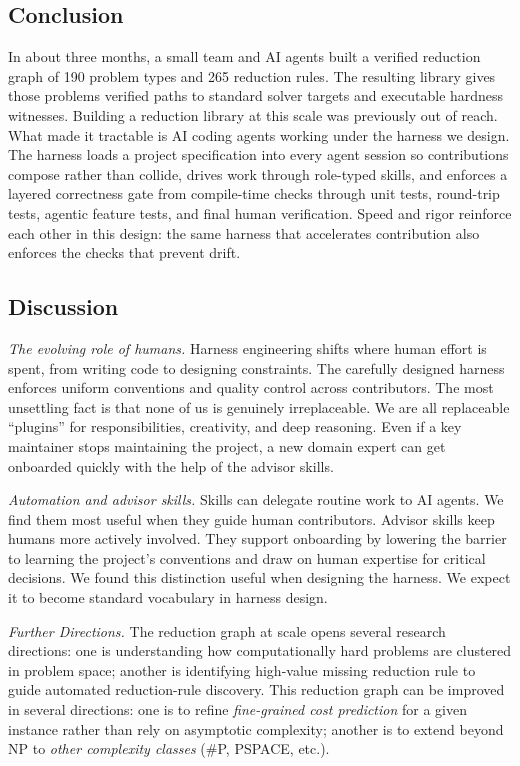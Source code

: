 \documentclass{article}
\begin{document}
\subsection{Conclusion}

In about three months, a small team and AI agents built a verified reduction graph of 190 problem types and 265 reduction rules. The resulting library gives those problems verified paths to standard solver targets and executable hardness witnesses.
Building a reduction library at this scale was previously out of reach. What made it tractable is AI coding agents working under the harness we design. The harness loads a project specification into every agent session so contributions compose rather than collide, drives work through role-typed skills, and enforces a layered correctness gate from compile-time checks through unit tests, round-trip tests, agentic feature tests, and final human verification. Speed and rigor reinforce each other in this design: the same harness that accelerates contribution also enforces the checks that prevent drift.


\subsection{Discussion}

\emph{The evolving role of humans.} Harness engineering shifts where human effort is spent, from writing code to designing constraints. The carefully designed harness enforces uniform conventions and quality control across contributors. The most unsettling fact is that none of us is genuinely irreplaceable. We are all replaceable ``plugins'' for responsibilities, creativity, and deep reasoning. Even if a key maintainer stops maintaining the project, a new domain expert can get onboarded quickly with the help of the advisor skills.

\emph{Automation and advisor skills.} Skills can delegate routine work to AI agents. We find them most useful when they guide human contributors. Advisor skills keep humans more actively involved. They support onboarding by lowering the barrier to learning the project's conventions and draw on human expertise for critical decisions. We found this distinction useful when designing the harness. We expect it to become standard vocabulary in harness design.

\emph{Further Directions.}
The reduction graph at scale opens several research directions: one is understanding how computationally hard problems are clustered in problem space; another is identifying high-value missing reduction rule to guide automated reduction-rule discovery.
This reduction graph can be improved in several directions: one is to refine \emph{fine-grained cost prediction} for a given instance rather than rely on asymptotic complexity; another is to extend beyond NP to \emph{other complexity classes} (\#P, PSPACE, etc.).
\end{document}
